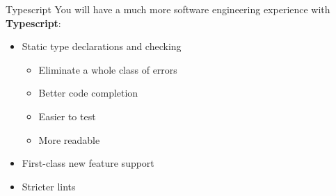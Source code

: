 \documentclass[../index.tex]{subfiles}
\begin{document}
\renewcommand{\currenttitle}{Typescript}
\begin{frame}[fragile]{\currenttitle}
  You will have a much more software engineering experience with
  \textbf{Typescript}:

  \begin{itemize}
    \item Static type declarations and checking
      \begin{itemize}
        \item Eliminate a whole class of errors
        \item Better code completion
        \item Easier to test
        \item More readable
      \end{itemize}
      \item First-class new feature support
    \item Stricter lints
  \end{itemize}
\end{frame}

\end{document}
